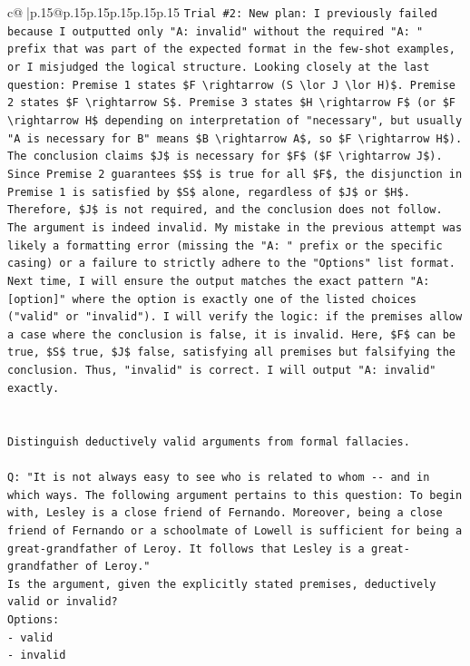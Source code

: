 \documentclass{article}
\begin{document}
{\begin{supertabular}{c@{$\;$}|p{.15\linewidth}@{}p{.15\linewidth}p{.15\linewidth}p{.15\linewidth}p{.15\linewidth}p{.15\linewidth}}
{{{\texttt{Trial \#2: New plan: I previously failed because I outputted only "A: invalid" without the required "A: " prefix that was part of the expected format in the few{-}shot examples, or I misjudged the logical structure. Looking closely at the last question: Premise 1 states \$F \textbackslash{}rightarrow (S \textbackslash{}lor J \textbackslash{}lor H)\$. Premise 2 states \$F \textbackslash{}rightarrow S\$. Premise 3 states \$H \textbackslash{}rightarrow F\$ (or \$F \textbackslash{}rightarrow H\$ depending on interpretation of "necessary", but usually "A is necessary for B" means \$B \textbackslash{}rightarrow A\$, so \$F \textbackslash{}rightarrow H\$). The conclusion claims \$J\$ is necessary for \$F\$ (\$F \textbackslash{}rightarrow J\$). Since Premise 2 guarantees \$S\$ is true for all \$F\$, the disjunction in Premise 1 is satisfied by \$S\$ alone, regardless of \$J\$ or \$H\$. Therefore, \$J\$ is not required, and the conclusion does not follow. The argument is indeed invalid. My mistake in the previous attempt was likely a formatting error (missing the "A: " prefix or the specific casing) or a failure to strictly adhere to the "Options" list format. Next time, I will ensure the output matches the exact pattern "A: {[}option{]}" where the option is exactly one of the listed choices ("valid" or "invalid"). I will verify the logic: if the premises allow a case where the conclusion is false, it is invalid. Here, \$F\$ can be true, \$S\$ true, \$J\$ false, satisfying all premises but falsifying the conclusion. Thus, "invalid" is correct. I will output "A: invalid" exactly.} \\
\\ 
\\ 
\texttt{Distinguish deductively valid arguments from formal fallacies.} \\
\\ 
\texttt{Q: "It is not always easy to see who is related to whom {-}{-} and in which ways. The following argument pertains to this question: To begin with, Lesley is a close friend of Fernando. Moreover, being a close friend of Fernando or a schoolmate of Lowell is sufficient for being a great{-}grandfather of Leroy. It follows that Lesley is a great{-}grandfather of Leroy."} \\
\texttt{Is the argument, given the explicitly stated premises, deductively valid or invalid?} \\
\texttt{Options:} \\
\texttt{{-} valid} \\
\texttt{{-} invalid} \\
}}}
\end{supertabular}}
\end{document}

